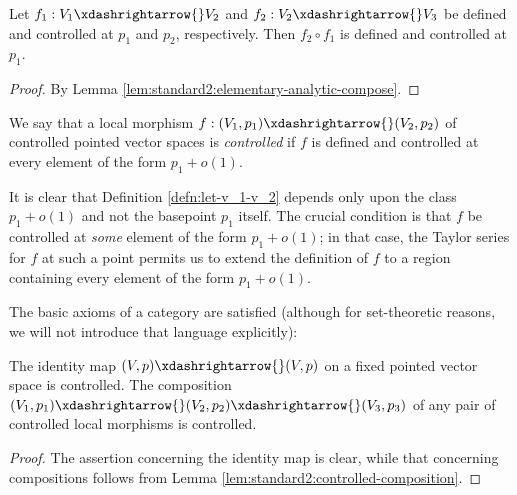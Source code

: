 \begin{lemma}\label{lem:standard2:controlled-composition}
  Let $f_1 : V_1 \xdashrightarrow{} V_2$ and $f_2 : V_2 \xdashrightarrow{} V_3$ be defined and controlled at $p_1$ and $p_2$, respectively.  Then $f_2 \circ f_1$ is defined and controlled at $p_1$.
\end{lemma}
\begin{proof}
  By Lemma \ref{lem:standard2:elementary-analytic-compose}.
\end{proof}

\begin{definition}\label{defn:let-v_1-v_2}
  We say that a local morphism $f : (V_1, p_1) \xdashrightarrow{} (V_2, p_2)$ of controlled pointed vector spaces is \emph{controlled} if $f$ is defined and controlled at every element of the form $p_1 + o(1)$.
\end{definition}

\begin{remark}
  It is clear that Definition \ref{defn:let-v_1-v_2} depends only upon the class $p_1 + o(1)$ and not the basepoint $p_1$ itself.  The crucial condition is that $f$ be controlled at \emph{some} element of the form $p_1 + o(1)$; in that case, the Taylor series for $f$ at such a point permits us to extend the definition of $f$ to a region containing every element of the form $p_1 + o(1)$.
\end{remark}


The basic axioms of a category are satisfied (although for set-theoretic reasons, we will not introduce that language explicitly):
\begin{lemma}\label{lem:identity-map--m-0}
  The identity map $(V,p) \xdashrightarrow{} (V,p)$ on a fixed pointed vector space is controlled.  The composition $(V_1,p_1) \xdashrightarrow{} (V_2, p_2) \xdashrightarrow{} (V_3, p_3)$ of any pair of controlled local morphisms is controlled.
\end{lemma}
\begin{proof}
  The assertion concerning the identity map is clear, while that concerning compositions follows from Lemma \ref{lem:standard2:controlled-composition}.
\end{proof}

